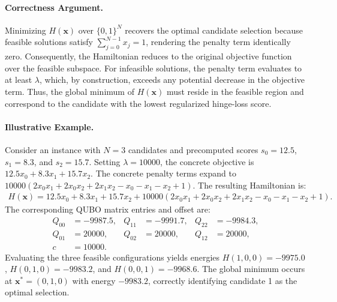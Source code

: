 \documentclass[12pt]{article}
\begin{document}
\paragraph{Correctness Argument.}
Minimizing $H(\mathbf{x})$ over $\{0,1\}^N$ recovers the optimal candidate selection because feasible solutions satisfy $\sum_{j=0}^{N-1} x_j = 1$, rendering the penalty term identically zero. Consequently, the Hamiltonian reduces to the original objective function over the feasible subspace. For infeasible solutions, the penalty term evaluates to at least $\lambda$, which, by construction, exceeds any potential decrease in the objective term. Thus, the global minimum of $H(\mathbf{x})$ must reside in the feasible region and correspond to the candidate with the lowest regularized hinge-loss score.

\paragraph{Illustrative Example.}
Consider an instance with $N=3$ candidates and precomputed scores $s_0 = 12.5$, $s_1 = 8.3$, and $s_2 = 15.7$. Setting $\lambda = 10000$, the concrete objective is $12.5 x_0 + 8.3 x_1 + 15.7 x_2$. The concrete penalty terms expand to $10000 \left( 2x_0 x_1 + 2x_0 x_2 + 2x_1 x_2 - x_0 - x_1 - x_2 + 1 \right)$. The resulting Hamiltonian is:
\begin{align}
  H(\mathbf{x}) = 12.5 x_0 + 8.3 x_1 + 15.7 x_2 + 10000 \left( 2x_0 x_1 + 2x_0 x_2 + 2x_1 x_2 - x_0 - x_1 - x_2 + 1 \right).
\end{align}
The corresponding QUBO matrix entries and offset are:
\begin{align}
  Q_{00} &= -9987.5, & Q_{11} &= -9991.7, & Q_{22} &= -9984.3, \\
  Q_{01} &= 20000, & Q_{02} &= 20000, & Q_{12} &= 20000, \\
  c &= 10000.
\end{align}
Evaluating the three feasible configurations yields energies $H(1,0,0) = -9975.0$, $H(0,1,0) = -9983.2$, and $H(0,0,1) = -9968.6$. The global minimum occurs at $\mathbf{x}^* = (0, 1, 0)$ with energy $-9983.2$, correctly identifying candidate 1 as the optimal selection.
\end{document}
